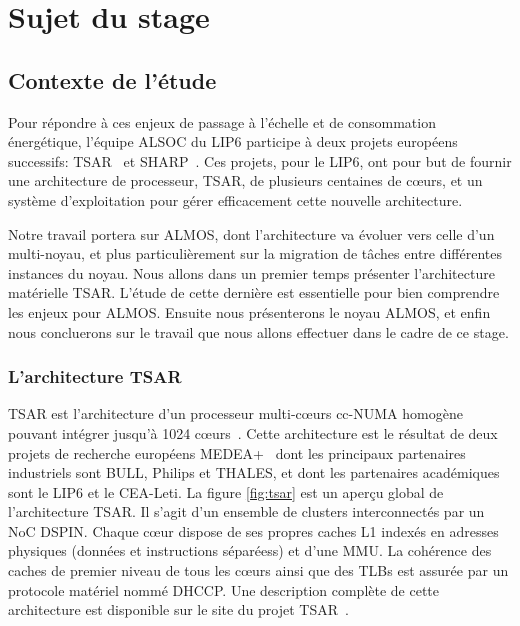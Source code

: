 \chapter{Sujet du stage}
\label{chap:subject}

  \section{Contexte de l'étude}

    Pour répondre à ces enjeux de passage à l'échelle et de consommation
    énergétique, l'équipe ALSOC du LIP6 participe à deux projets européens
    successifs: TSAR~\cite{tsar2008} et SHARP~\cite{sharp2012}. Ces projets,
    pour le LIP6, ont pour but de fournir une architecture de processeur, TSAR,
    de plusieurs centaines de c\oe urs, et un système d'exploitation pour gérer
    efficacement cette nouvelle architecture.

    Notre travail portera sur ALMOS, dont l'architecture va évoluer vers celle
    d'un multi-noyau, et plus particulièrement sur la migration de tâches entre
    différentes instances du noyau. Nous allons dans un premier temps présenter
    l'architecture matérielle TSAR. L'étude de cette dernière est essentielle
    pour bien comprendre les enjeux pour ALMOS. Ensuite nous présenterons le
    noyau ALMOS, et enfin nous concluerons sur le travail que nous allons
    effectuer dans le cadre de ce stage.
  

    \subsection{L'architecture TSAR}
    \label{sec:tsar}

      TSAR est l'architecture d’un processeur multi-c\oe urs cc-NUMA homogène
      pouvant intégrer jusqu’à 1024 c\oe urs~\cite{greiner2009tsar}. Cette
      architecture est le résultat de deux projets de recherche européens
      MEDEA+~\cite{tsar2008,sharp2012} dont les principaux partenaires
      industriels sont BULL, Philips et THALES, et dont les partenaires
      académiques sont le LIP6 et le CEA-Leti. La figure \ref{fig:tsar} est un
      aperçu global de l'architecture TSAR. Il s'agit d'un ensemble de clusters
      interconnectés par un NoC DSPIN. Chaque c\oe ur dispose de ses propres
      caches L1 indexés en adresses physiques (données et instructions
      séparéess) et d'une MMU. La cohérence des caches de premier niveau de tous
      les c\oe urs ainsi que des TLBs est assurée par un protocole matériel
      nommé DHCCP. Une description complète de cette architecture est disponible
      sur le site du projet TSAR~\cite{tsar2008web}.

